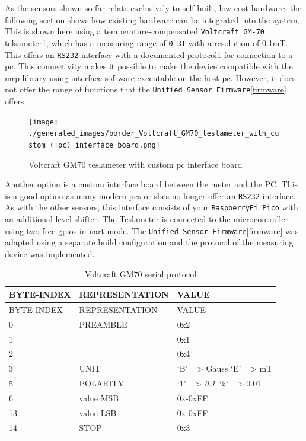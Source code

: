 As the sensors shown so far relate exclusively to self-built, low-cost
hardware, the following section shows how existing hardware can be
integrated into the system. This is shown here using a
temperature-compensated \passthrough{\lstinline!Voltcraft GM-70!}
telsameter\ref{Voltcraft_GM70_teslameter_with_custom_(+pc)_interface_board.png},
which has a measuring range of \passthrough{\lstinline!0-3T!} with a
resolution of 0.1mT. This offers an \passthrough{\lstinline!RS232!}
interface with a documented
protocol\ref{Voltcraft_GM70_serial_protocol.csv} for connection to a
\gls{pc}. This connectivity makes it possible to make the device
compatible with the \gls{mrp} library using interface software
\cite{VoltcraftGM70Rest} executable on the host \gls{pc}. However,
it does not offer the range of functions that the
\passthrough{\lstinline!Unified Sensor Firmware!}\ref{firmware} offers.

\begin{figure}
\centering
\texttt{[image: ./generated\_images/border\_Voltcraft\_GM70\_teslameter\_with\_custom\_(+pc)\_interface\_board.png]}
\caption{Voltcraft GM70 teslameter with custom \gls{pc} interface board
\label{Voltcraft_GM70_teslameter_with_custom_(+pc)_interface_board.png}}
\end{figure}

Another option is a custom interface board between the meter and the PC.
This is a good option as many modern \gls{pc}s or \gls{sbc}s no longer
offer an \passthrough{\lstinline!RS232!} interface. As with the other
sensors, this interface consists of your
\passthrough{\lstinline!RaspberryPi Pico!} with an additional level
shifter. The Teslameter is connected to the microcontroller using two
free \gls{gpio}s in \gls{uart} mode. The
\passthrough{\lstinline!Unified Sensor Firmware!}\ref{firmware} was
adapted using a separate build configuration and the protocol of the
measuring device was implemented.

\begin{longtable}[]{@{}lll@{}}
\caption{Voltcraft GM70 serial protocol
\label{Voltcraft_GM70_serial_protocol.csv}}\tabularnewline
\toprule
BYTE-INDEX & REPRESENTATION & VALUE\tabularnewline
\midrule
\endfirsthead
\toprule
BYTE-INDEX & REPRESENTATION & VALUE\tabularnewline
\midrule
\endhead
0 & PREAMBLE & 0x2\tabularnewline
1 & & 0x1\tabularnewline
2 & & 0x4\tabularnewline
3 & UNIT & `B' =\textgreater{} Gauss `E' =\textgreater{}
mT\tabularnewline
5 & POLARITY & `1' =\textgreater{} \emph{0.1 `2' =\textgreater{}
}0.01\tabularnewline
6 & value MSB & 0x-0xFF\tabularnewline
13 & value LSB & 0x-0xFF\tabularnewline
14 & STOP & 0x3\tabularnewline
\bottomrule
\end{longtable}

